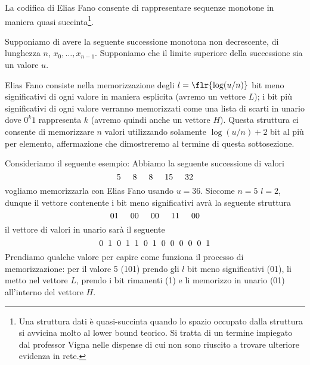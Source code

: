 La codifica di Elias Fano consente di rappresentare sequenze monotone in maniera quasi succinta\footnote{Una struttura dati è quasi-succinta quando lo spazio occupato dalla struttura si avvicina molto al lower bound teorico. Si tratta di un termine impiegato dal professor Vigna nelle dispense di cui non sono riuscito a trovare ulteriore evidenza in rete.}.

Supponiamo di avere la seguente successione monotona non decrescente, di lunghezza $n$, $x_0, \dots, x_{n - 1}$. Supponiamo che il limite superiore della successione sia un valore $u$.

Elias Fano consiste nella memorizzazione degli $l = \flr{\log(u / n)}$ bit meno significativi di ogni valore in maniera esplicita (avremo un vettore $L$); i bit più significativi di ogni valore verranno memorizzati come una lista di scarti in unario dove $0^k1$ rappresenta $k$ (avremo quindi anche un vettore $H$). Questa struttura ci consente di memorizzare $n$ valori utilizzando solamente $\log(u / n) + 2$ bit al più per elemento, affermazione che dimostreremo al termine di questa sottosezione.

Consideriamo il seguente esempio: Abbiamo la seguente successione di valori
\begin{equation*}
    5\hspace{5mm}8\hspace{5mm}8\hspace{5mm}15\hspace{5mm}32
\end{equation*}
vogliamo memorizzarla con Elias Fano usando $u = 36$. Siccome $n = 5$ $l = 2$, dunque il vettore contenente i bit meno significativi avrà la seguente struttura
\begin{equation*}
    01\hspace{5mm}00\hspace{5mm}00\hspace{5mm}11\hspace{5mm}00
\end{equation*}
il vettore di valori in unario sarà il seguente
\begin{equation*}
    0\hspace{2mm}1\hspace{2mm}0\hspace{2mm}1\hspace{2mm}1\hspace{2mm}0\hspace{2mm}1\hspace{2mm}0\hspace{2mm}0\hspace{2mm}0\hspace{2mm}0\hspace{2mm}0\hspace{2mm}1
\end{equation*}
Prendiamo qualche valore per capire come funziona il processo di memorizzazione:
per il valore 5 (101) prendo gli $l$ bit meno significativi (01), li metto nel vettore $L$, prendo i bit rimanenti (1) e li memorizzo in unario (01) all'interno del vettore $H$.

